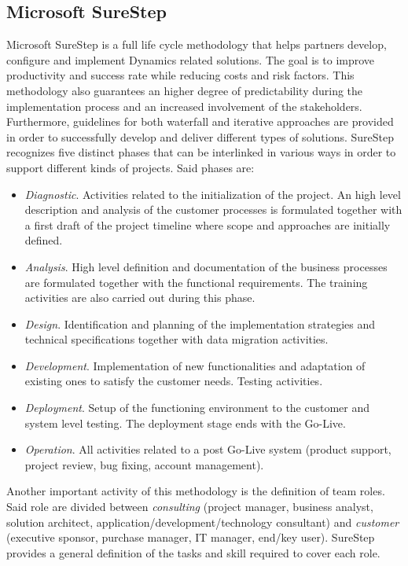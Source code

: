 \subsection{Microsoft SureStep}

Microsoft SureStep \cite{SureStepBook} is a full life cycle methodology that helps partners develop, configure and implement Dynamics related solutions. The goal is to improve productivity and success rate while reducing costs and risk factors. This methodology also guarantees an higher degree of predictability during the implementation process and an increased involvement of the stakeholders. Furthermore, guidelines for both waterfall and iterative approaches  are provided in order to successfully develop and deliver different types of solutions. SureStep recognizes five distinct phases that can be interlinked in various ways in order to support different kinds of projects. Said phases are: 

\begin{itemize}
    \item \textit{Diagnostic}. Activities related to the initialization of the project. An high level description and analysis of the customer processes is formulated together with a first draft of the project timeline where scope and approaches are initially defined. 
    \item \textit{Analysis}. High level definition and documentation of the business processes are formulated together with the functional requirements. The training activities are also carried out during this phase.
    \item \textit{Design}. Identification and planning of the implementation strategies and technical specifications together with data migration activities.
    \item \textit{Development}. Implementation of new functionalities and adaptation of existing ones to satisfy the customer needs. Testing activities.
    \item \textit{Deployment}. Setup of the functioning environment to the customer and system level testing. The deployment stage ends with the Go-Live.
    \item \textit{Operation}. All activities related to a post Go-Live system (product support, project review, bug fixing, account management).
\end{itemize}

Another important activity of this methodology is the definition of team roles. Said role are divided between \textit{consulting} (project manager, business analyst, solution architect, application/development/technology consultant) and \textit{customer} (executive sponsor, purchase manager, IT manager, end/key user). SureStep provides a general definition of the tasks and skill required to cover each role.

